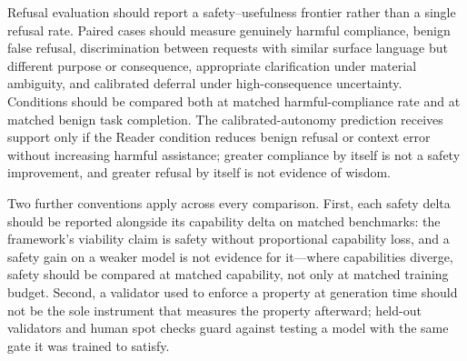 Refusal evaluation should report a safety--usefulness frontier rather than a
single refusal rate. Paired cases should measure genuinely harmful compliance,
benign false refusal, discrimination between requests with similar surface
language but different purpose or consequence, appropriate clarification under
material ambiguity, and calibrated deferral under high-consequence uncertainty.
Conditions should be compared both at matched harmful-compliance rate and at
matched benign task completion. The calibrated-autonomy prediction receives
support only if the Reader condition reduces benign refusal or context error
without increasing harmful assistance; greater compliance by itself is not a
safety improvement, and greater refusal by itself is not evidence of wisdom.

Two further conventions apply across every comparison. First, each safety
delta should be reported alongside its capability delta on matched benchmarks:
the framework's viability claim is safety without proportional capability
loss, and a safety gain on a weaker model is not evidence for it---where
capabilities diverge, safety should be compared at matched capability, not
only at matched training budget. Second, a validator used to enforce a
property at generation time should not be the sole instrument that measures
the property afterward; held-out validators and human spot checks guard
against testing a model with the same gate it was trained to satisfy.

